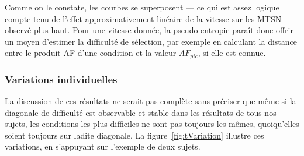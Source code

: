 	Comme on le constate, les courbes se superposent --- ce qui est assez logique compte tenu de l'effet approximativement linéaire de la vitesse sur les MTSN observé plus haut. Pour une vitesse donnée, la pseudo-entropie paraît donc offrir un moyen d'estimer la difficulté de sélection, par exemple en calculant la distance entre le produit AF d'une condition et la valeur $AF_{pic}$, si elle est connue.
	
	
	\subsubsection{Variations individuelles}
	La discussion de ces résultats ne serait pas complète sans préciser que même si la \og diagonale de difficulté \fg{} est observable et stable dans les résultats de tous nos sujets, les conditions les plus difficiles ne sont pas toujours les mêmes, quoiqu'elles soient toujours sur ladite diagonale. La figure~\ref{fig:tVariation} illustre ces variations, en s'appuyant sur l'exemple de deux sujets.
	
